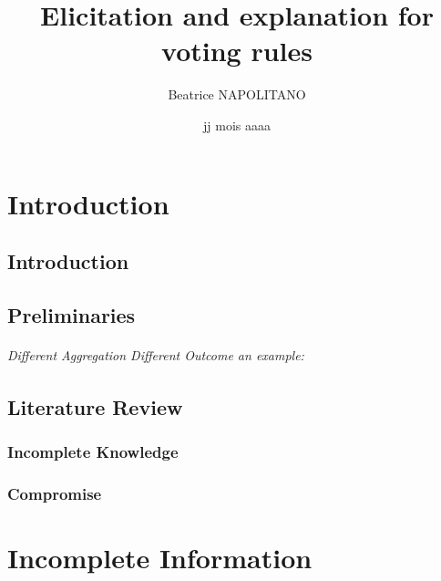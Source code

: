 \documentclass[a4paper, 11pt]{book}
\title{Elicitation and explanation for voting rules}
\author{Beatrice NAPOLITANO}
\institute{l'Université Paris-Dauphine}
\date{jj mois aaaa}
\begin{document}
\maketitle{}

\frontmatter

\begingroup
\hypersetup{hidelinks}

\tableofcontents

\listoffigures
{}

\listoftables
{}

\endgroup

\printglossary[toctitle=List of Abbreviations,title=List of Abbreviations,type=\acronymtype]

\mainmatter

\part{Introduction} 

	\chapter{Introduction}
		
			
	\chapter{Preliminaries}
		\label{ch:preliminaries}
		
		\paragraph{Different Aggregation Different Outcome an example:}
		
	
	\chapter{Literature Review}
		\section{Incomplete Knowledge}
		\section{Compromise}
	
	
\part{Incomplete Information}
	\label{part:info}
\end{document}

